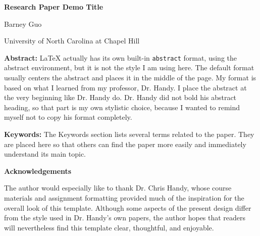 \documentclass[11pt]{article}
\begin{document}
\small

\begin{center}
\Large
\textbf{Research Paper Demo Title}

\vspace{2em}

\normalsize
Barney Guo\footnotemark[1]

\vspace{0.1em}

University of North Carolina at Chapel Hill \\
\end{center}

\vspace{2em}

\noindent\textbf{Abstract:} LaTeX actually has its own built-in \texttt{abstract} format, using the abstract environment, but it is not the style I am using here. The default format usually centers the abstract and places it in the middle of the page. My format is based on what I learned from my professor, Dr. Handy. I place the abstract at the very beginning like Dr. Handy do. Dr. Handy did not bold his abstract heading, so that part is my own stylistic choice, because I wanted to remind myself not to copy his format completely.

\vspace{1em}

\noindent\textbf{Keywords:} The Keywords section lists several terms related to the paper. They are placed here so that others can find the paper more easily and immediately understand its main topic.





\newpage

\thispagestyle{empty}
\vspace*{\fill}

\begin{center}
\textbf{Acknowledgements}
\end{center}

\noindent
The author would especially like to thank Dr. Chris Handy, whose course materials and assignment formatting provided much of the inspiration for the overall look of this template. Although some aspects of the present design differ from the style used in Dr. Handy’s own papers, the author hopes that readers will nevertheless find this template clear, thoughtful, and enjoyable.


\vspace*{\fill}
\end{document}

